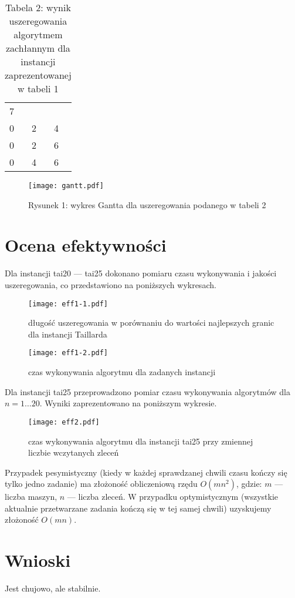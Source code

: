 \documentclass[10pt,a4paper]{article}
\begin{document}
\begin{table}[H]
    \begin{center}
        \begin{tabular}{ l l l }
            7 & &\\
            0 & 2 & 4\\
            0 & 2 & 6\\
            0 & 4 & 6
        \end{tabular}
        \caption*{Tabela 2: wynik uszeregowania algorytmem zachłannym dla instancji zaprezentowanej w tabeli 1}
    \end{center}
\end{table}

\begin{figure}[H]
    \centering
    \texttt{[image: gantt.pdf]}
    \caption*{Rysunek 1: wykres Gantta dla uszeregowania podanego w tabeli 2}
\end{figure}

\section{Ocena efektywności}
Dla instancji tai20 --- tai25 dokonano pomiaru czasu wykonywania i jakości uszeregowania, co przedstawiono na poniższych wykresach.

\begin{figure}[H]
\centering
\texttt{[image: eff1-1.pdf]} 
\caption{długość uszeregowania w porównaniu do wartości najlepszych granic dla instancji Taillarda}
\label{eff11}
\end{figure}

\begin{figure}[H]
    \centering
    \texttt{[image: eff1-2.pdf]}
    \caption{czas wykonywania algorytmu dla zadanych instancji}
    \label{eff12}
\end{figure}

 
Dla instancji tai25 przeprowadzono pomiar czasu wykonywania algorytmów dla $n=1\ldots20$. Wyniki zaprezentowano na poniższym wykresie.

\begin{figure}[H]
    \centering
    \texttt{[image: eff2.pdf]}
    \caption{czas wykonywania algorytmu dla instancji tai25 przy zmiennej liczbie wczytanych zleceń}
\end{figure}

Przypadek pesymistyczny (kiedy w każdej sprawdzanej chwili czasu kończy się tylko jedno zadanie) ma złożoność obliczeniową rzędu $O(mn^2)$, gdzie: $m$ --- liczba maszyn, $n$ --- liczba zleceń. W przypadku optymistycznym (wszystkie aktualnie przetwarzane zadania kończą się w tej samej chwili) uzyskujemy złożoność $O(mn)$. 
    
\section{Wnioski}
Jest chujowo, ale stabilnie.
\end{document}
